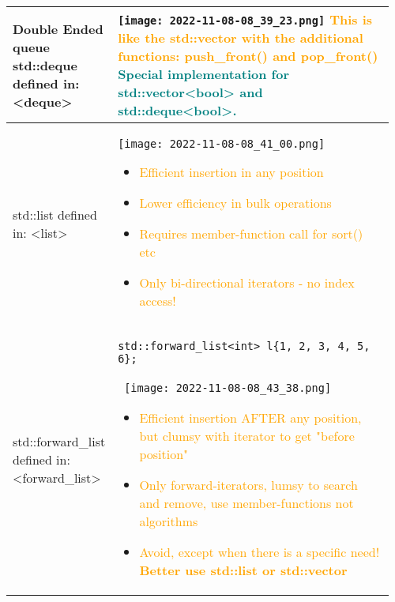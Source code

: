 \documentclass[main.tex,fontsize=8pt,paper=a4,paper=portrait,DIV=calc]{scrartcl}
\begin{document}
\pagebreak
\begin{table}[ht!]
\begin{tabular}{|m{0.2\linewidth}|m{0.755\linewidth}|}
\hline
Double Ended queue std::deque \newline 
defined in: <deque>& 
\vspace{2mm}
\texttt{[image: 2022-11-08-08\_39\_23.png]}\newline
\textcolor{orange}{This is like the std::vector with the additional functions: \textbf{push\_front() and pop\_front()}}\newline
\textcolor{teal}{Special implementation for std::vector<bool> and std::deque<bool>.}\\
\hline
std::list \newline 
defined in: <list> & 
\vspace{2mm}
\texttt{[image: 2022-11-08-08\_41\_00.png]}\newline
\begin{itemize}
\item \textcolor{orange}{Efficient insertion in any position}
\item \textcolor{orange}{Lower efficiency in bulk operations}
\item \textcolor{orange}{Requires member-function call for sort() etc}
\item \textcolor{orange}{Only bi-directional iterators - no index access!}
\vspace{-2mm}
\end{itemize}\\
\hline
std::forward\_list \newline 
defined in: <forward\_list> & 
\begin{lstlisting}
std::forward_list<int> l{1, 2, 3, 4, 5, 6};
\end{lstlisting}
\, \newline
\texttt{[image: 2022-11-08-08\_43\_38.png]}\newline
\begin{itemize}
\item \textcolor{orange}{Efficient insertion AFTER any position, but clumsy with iterator to get "before position"}
\item \textcolor{orange}{Only forward-iterators, lumsy to search and remove, use member-functions not algorithms}
\item \textcolor{orange}{Avoid, except when there is a specific need! \textbf{Better use std::list or std::vector}}
\vspace{-2mm}
\end{itemize}\\

\end{tabular}
\end{table}
\end{document}
